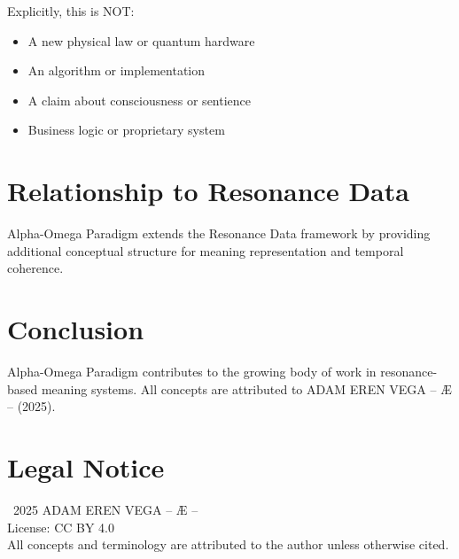 \documentclass[12pt,a4paper]{article}
\begin{document}
Explicitly, this is NOT:
\begin{itemize}
    \item A new physical law or quantum hardware
    \item An algorithm or implementation
    \item A claim about consciousness or sentience
    \item Business logic or proprietary system
\end{itemize}

\section{Relationship to Resonance Data}

Alpha-Omega Paradigm extends the Resonance Data framework by providing additional conceptual structure for meaning representation and temporal coherence.

\section{Conclusion}

Alpha-Omega Paradigm contributes to the growing body of work in resonance-based meaning systems. All concepts are attributed to ADAM EREN VEGA – Æ – (2025).

\section*{Legal Notice}

\textcopyright\ 2025 ADAM EREN VEGA – Æ –\\
License: CC BY 4.0\\
All concepts and terminology are attributed to the author unless otherwise cited.
\end{document}
